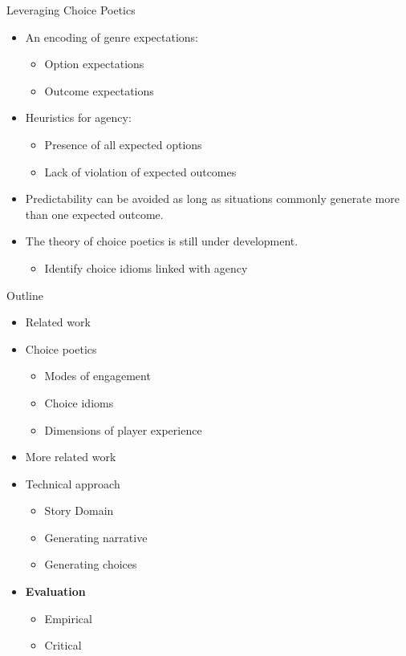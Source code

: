 \documentclass[xcolor=x11names]{beamer}
\begin{document}
\begin{frame}{Leveraging Choice Poetics}
  \begin{itemize}
    \item An encoding of genre expectations:
      \begin{itemize}
        \item Option expectations
        \item Outcome expectations
      \end{itemize}
    \item Heuristics for agency:
      \begin{itemize}
        \item Presence of all expected options
        \item Lack of violation of expected outcomes
      \end{itemize}
    \item Predictability can be avoided as long as situations commonly generate more than one expected outcome.
    \pause
    \item The theory of choice poetics is still under development.
      \begin{itemize}
        \item Identify choice idioms linked with agency
      \end{itemize}
  \end{itemize}
\end{frame}

\begin{frame}{Outline}
  \begin{itemize}
    \item Related work
    \item Choice poetics
    \begin{itemize}
      \item Modes of engagement
      \item Choice idioms
      \item Dimensions of player experience
    \end{itemize}
    \item More related work
    \item Technical approach
    \begin{itemize}
      \item Story Domain
      \item Generating narrative
      \item Generating choices
    \end{itemize}
  \item \textbf{Evaluation}
    \begin{itemize}
      \item Empirical
      \item Critical
    \end{itemize}
  \end{itemize}
\end{frame}
\end{document}
